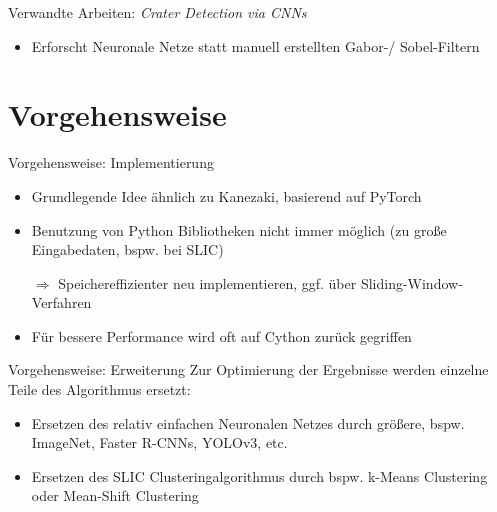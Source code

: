 \documentclass[9pt]{beamer}
\begin{document}
\begin{frame}{Verwandte Arbeiten: \textit{Crater Detection via CNNs}\cite{2016arXiv160100978C}}
\begin{itemize}
	\item Erforscht Neuronale Netze statt manuell erstellten Gabor-/ Sobel-Filtern
\end{itemize}
\end{frame}

\section{Vorgehensweise}

\begin{frame}{Vorgehensweise: Implementierung}
\begin{itemize}
	\item Grundlegende Idee ähnlich zu Kanezaki\cite{kanezaki2018_unsupervised_segmentation}, basierend auf PyTorch
	\item Benutzung von Python Bibliotheken nicht immer möglich (zu große Eingabedaten, bspw. bei SLIC\cite{slic})
	\item[$\Rightarrow$] Speichereffizienter neu implementieren, ggf. über Sliding-Window-Verfahren
	\item Für bessere Performance wird oft auf Cython\cite{behnel2010cython} zurück gegriffen
\end{itemize}	
\end{frame}

\begin{frame}{Vorgehensweise: Erweiterung}
Zur Optimierung der Ergebnisse werden einzelne Teile des Algorithmus ersetzt:
\begin{itemize}
	\item Ersetzen des relativ einfachen Neuronalen Netzes durch größere, bspw. ImageNet, Faster R-CNNs, YOLOv3, etc.
	\item Ersetzen des SLIC Clusteringalgorithmus durch bspw. k-Means Clustering oder Mean-Shift Clustering
\end{itemize}	
\end{frame}
\end{document}

